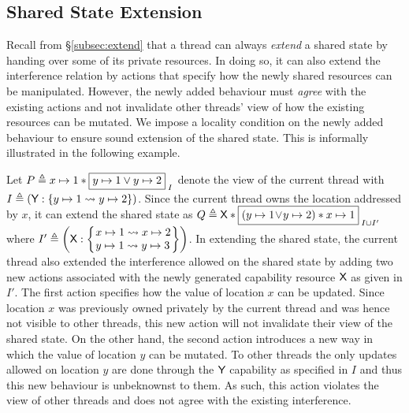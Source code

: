 \subsection{Shared State Extension}\label{subsec:extension}
Recall from \S\ref{subsec:extend} that a thread can always \emph{extend} a shared state by handing over some of its private resources. In doing so, it can also extend the interference relation by actions that specify how the newly shared resources can be manipulated. However, the newly added behaviour must \emph{agree} with the existing actions and not invalidate other threads' view of how the existing resources can be mutated. We impose a locality condition on the newly added behaviour to ensure sound extension of the shared state. This is informally illustrated in the following example. 
%
\begin{example}\label{ex:badExtension}
Let $P \triangleq x \mapsto 1 * \boxed{y \mapsto 1 \lor y \mapsto 2}_{\; I}$ denote the view of the current thread with $I \triangleq \left(\textsf{Y}: \left\{y \mapsto 1 \rightsquigarrow y \mapsto 2\right\} \right)$. Since the current thread owns the location addressed by $x$, it can extend the shared state as $Q \triangleq \textsf{X} * \boxed{\left(y \mapsto 1 \!\lor\! y \mapsto 2 \right) * x \mapsto 1}_{\; I \cup I'}$ where 
$
	I' \eqdef 
		\left(
			\token{X}: 
			\left\{
			\hspace*{-0.15cm}
			\begin{array}{l} 
				\cell{x}{1} \swap \cell{x}{2}\\
				\cell{y}{1} \swap \cell{y}{3}
			\end{array}
			\hspace*{-0.15cm}
			\right\}
		 \right)
$.
In extending the shared state, the current thread also extended the interference allowed on the shared state by adding two new actions associated with the newly generated capability resource $\textsf{X}$ as given in $I'$. The first action specifies how the value of location $x$ can be updated. Since location $x$ was previously owned privately by the current thread and was hence not visible to other threads, this new action will not invalidate their view of the shared state. On the other hand, the second action introduces a new way in which the value of location $y$ can be mutated. To other threads the only updates allowed on location $y$ are done through the $\textsf{Y}$ capability as specified in $I$ and thus this new behaviour is unbeknownst to them. As such, this action violates the view of other threads and does not agree with the existing interference.
\end{example}
